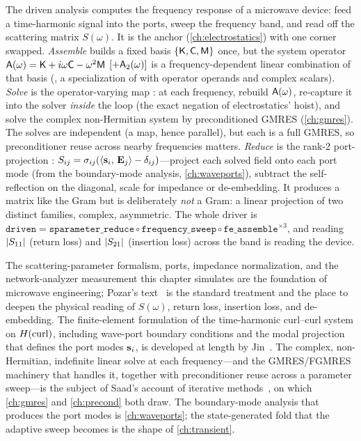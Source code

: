 \summarysection
The driven analysis computes the frequency response of a microwave device: feed a
time-harmonic signal into the ports, sweep the frequency band, and read off the
scattering matrix $S(\omega)$. It is the anchor (\cref{ch:electrostatics}) with one
corner swapped. \emph{Assemble} builds a fixed basis $\{\mathsf{K},\mathsf{C},\mathsf{M}\}$ once, but
the system operator $\mathsf{A}(\omega) = \mathsf{K} + i\omega\mathsf{C} - \omega^2\mathsf{M}$
$[+\mathsf{A}_2(\omega)]$ is a frequency-dependent linear combination of that basis
(, a specialization of 
with operator operands and complex scalars). \emph{Solve} is the operator-varying
map : at each frequency, rebuild $\mathsf{A}(\omega)$, re-capture
it into the solver \emph{inside} the loop (the exact negation of electrostatics'
hoist), and solve the complex non-Hermitian system by preconditioned GMRES
(\cref{ch:gmres}). The solves are independent (a map, hence parallel), but each is a
full GMRES, so preconditioner reuse across nearby frequencies matters. \emph{Reduce}
is the rank-2 port-projection :
$S_{ij} = \sigma_{ij}(\left\langle \mathbf{s}_i,\, \mathbf{E}_j\right\rangle - \delta_{ij})$---project each solved
field onto each port mode (from the boundary-mode analysis, \cref{ch:waveports}),
subtract the self-reflection on the diagonal, scale for impedance or de-embedding.
It produces a matrix like the Gram but is deliberately \emph{not} a Gram: a linear
projection of two distinct families, complex, asymmetric. The whole driver is
$\texttt{driven} = \texttt{sparameter\_reduce}\circ\texttt{frequency\_sweep}\circ
\texttt{fe\_assemble}^{\times3}$, and reading $\lvert S_{11}\rvert$ (return loss) and
$\lvert S_{21}\rvert$ (insertion loss) across the band is reading the device.

\furtherreading
The scattering-parameter formalism, ports, impedance normalization, and the
network-analyzer measurement this chapter simulates are the foundation of
microwave engineering; Pozar's text~\citep{pozar2011} is the standard treatment and
the place to deepen the physical reading of $S(\omega)$, return loss, insertion
loss, and de-embedding. The finite-element formulation of the time-harmonic
curl--curl system on $H(\mathrm{curl})$, including wave-port boundary conditions and the modal
projection that defines the port modes $\mathbf{s}_i$, is developed at length by
Jin~\citep{jin2014}. The complex, non-Hermitian, indefinite linear solve at each
frequency---and the GMRES/FGMRES machinery that handles it, together with
preconditioner reuse across a parameter sweep---is the subject of Saad's account of
iterative methods~\citep{saad2003}, on which \cref{ch:gmres} and \cref{ch:precond}
both draw. The boundary-mode analysis that produces the port modes is
\cref{ch:waveports}; the state-generated fold that the adaptive sweep becomes is the
shape of \cref{ch:transient}.

